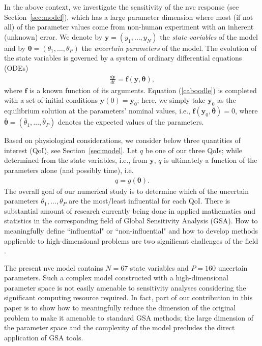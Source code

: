 In the above context, we investigate the sensitivity of  the \gls{nvc} response (see Section~\ref{sec:model}), which has a large parameter dimension where most (if not all) of the parameter values come from non-human experiment  with an inherent (unknown) error. We denote by $\mathbf y = (y_1, \dots, y_N)$  the {\sl state variables} of the model and by $\boldsymbol{\theta} = (\theta_1, \dots, \theta_P)$ the {\sl uncertain parameters} of the model. The evolution of the state variables is governed by a system of ordinary differential equations (ODEs) 
\begin{eqnarray}
\frac {d\boldsymbol{y}}{dt} = \mathbf{f}(\mathbf{y}, \boldsymbol{\theta}), \label{caboodle}
\end{eqnarray}
where $\mathbf{f}$ is a known function of its arguments. Equation (\ref{caboodle}) is completed with a set of initial conditions $\boldsymbol{y}(0) = \boldsymbol{y}_0$;  here, we simply take $\boldsymbol{y}_0$ as the  equilibrium solution at the parameters' nominal values, i.e., $\mathbf f(  \mathbf{y}_0, \bar{\boldsymbol{\theta}}) = 0$, where $ \bar{\boldsymbol{\theta}} = (\bar\theta_1, \dots, \bar\theta_P)$ denotes the expected values of the parameters.

Based on physiological considerations, we consider below three quantities of interest (QoI), see Section~\ref{sec:model}.  Let $q$ be one of our three  QoIs; while determined from the state variables, i.e., from $\mathbf y$, $q$ is  ultimately a function of the parameters alone (and possibly time), i.e.
\begin{eqnarray}
q = g(\boldsymbol{\theta}). \label{qoi}
\end{eqnarray}
The overall goal of our numerical study is to determine  which of the uncertain parameters $\theta_1, \dots, \theta_P$  are the most/least influential for each QoI. There is substantial amount of research currently being done in applied mathematics and statistics in the corresponding field of Global Sensitivity Analysis  (GSA). How to meaningfully define ``influential" or ``non-influential" and  how to develop methods applicable to high-dimensional problems are two significant challenges of the field \cite{corvar,timegsa,stogsa,iooss,owen,saltelli}. 



The present \gls{nvc} model contains $N=67$ state variables and   $P= 160$ uncertain parameters.
Such a complex model constructed with a high-dimensional parameter space is not easily amenable to sensitivity analyses considering the significant computing resource required. In fact, part of our contribution in this paper is to show how to meaningfully reduce the dimension of the original problem to make it amenable to standard  GSA methods; the large dimension of the parameter space and the complexity of the model precludes the  direct application of GSA tools. 

